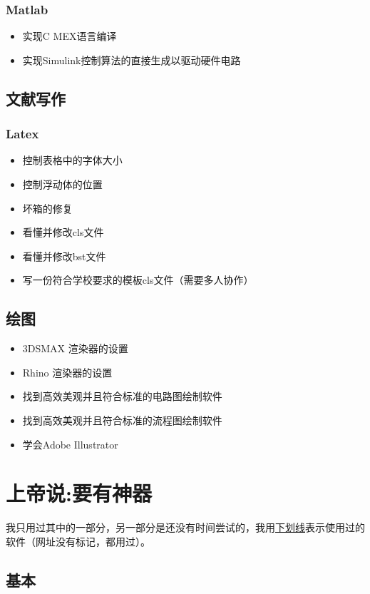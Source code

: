 \documentclass[UTF8,oneside]{ctexbook}
\begin{document}
\subsection{Matlab}
\begin{itemize}
	\item 实现C MEX语言编译
	\item 实现Simulink控制算法的直接生成以驱动硬件电路
\end{itemize}

\section{文献写作}
\subsection{Latex}
\begin{itemize}
	\item 控制表格中的字体大小
	\item 控制浮动体的位置
	\item 坏箱的修复
	\item 看懂并修改cls文件
	\item 看懂并修改bst文件
	\item 写一份符合学校要求的模板cls文件（需要多人协作）
\end{itemize}

\section{绘图}
\begin{itemize}
	\item 3DSMAX 渲染器的设置
	\item Rhino 渲染器的设置
	\item 找到高效美观并且符合标准的电路图绘制软件
	\item 找到高效美观并且符合标准的流程图绘制软件
	\item 学会Adobe Illustrator
\end{itemize}


\chapter{上帝说:要有神器}
我只用过其中的一部分，另一部分是还没有时间尝试的，我用\underline{下划线}表示使用过的软件（网址没有标记，都用过）。

\section{基本}
\end{document}
